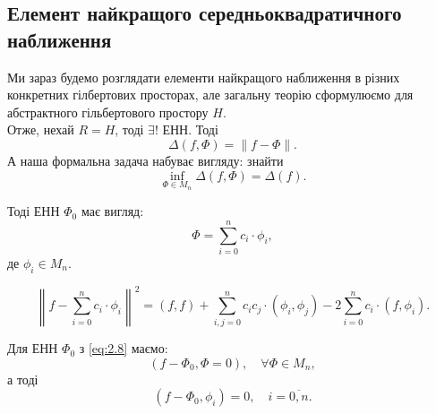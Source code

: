 
% 


% 



\subsection{Елемент найкращого середньоквадратичного наближення}

Ми зараз будемо розглядати елементи найкращого наближення в різних конкретних гілбертових просторах, але загальну теорію сформулюємо для абстрактного гільбертового простору $H$. \\

Отже, нехай $R = H$, тоді $\exists !$ ЕНН. Тоді
\begin{equation}
	\label{eq:2.12}
	\Delta(f, \Phi) = \| f - \Phi \|.
\end{equation}
А наша формальна задача набуває вигляду: знайти
\begin{equation}
	\label{eq:2.14}
	\inf_{\Phi \in M_n} \Delta(f, \Phi) = \Delta(f).
\end{equation}

Тоді ЕНН $\Phi_0$ має вигляд:
\begin{equation}
	\label{eq:2.15}
	\Phi = \sum_{i = 0}^n c_i \cdot \phi_i,
\end{equation}
де $\phi_i \in M_n$.

\begin{equation}
	\label{eq:2.16}
	\left\| f - \sum_{i = 0}^n c_i \cdot \phi_i \right\|^2 = (f, f) + \sum_{i, j = 0}^n c_i c_j \cdot (\phi_i, \phi_j) - 2 \sum_{i = 0}^n c_i \cdot (f, \phi_i).
\end{equation}

Для ЕНН $\Phi_0$ з \eqref{eq:2.8} маємо:
\begin{equation*}
	(f - \Phi_0, \Phi = 0), \quad \forall \Phi \in M_n,
\end{equation*}
а тоді
\begin{equation}
	\label{eq:2.17}
	(f - \Phi_0, \phi_i) = 0, \quad i = \overline{0, n}.
\end{equation}


